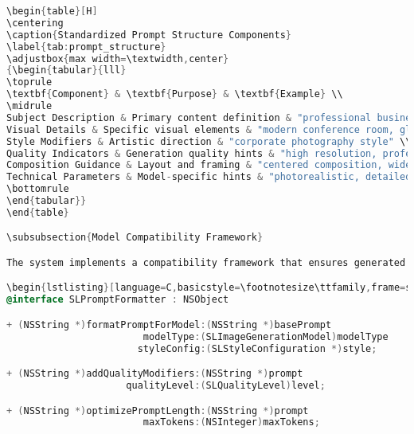 \begin{lstlisting}[language=C,basicstyle=\footnotesize\ttfamily,frame=single,breaklines=true,columns=flexible,caption={Simple Caching Implementation},label={lst:simple_caching}]
\begin{table}[H]
\centering
\caption{Standardized Prompt Structure Components}
\label{tab:prompt_structure}
\adjustbox{max width=\textwidth,center}
{\begin{tabular}{lll}
\toprule
\textbf{Component} & \textbf{Purpose} & \textbf{Example} \\
\midrule
Subject Description & Primary content definition & "professional business meeting" \\
Visual Details & Specific visual elements & "modern conference room, glass table" \\
Style Modifiers & Artistic direction & "corporate photography style" \\
Quality Indicators & Generation quality hints & "high resolution, professional lighting" \\
Composition Guidance & Layout and framing & "centered composition, wide angle" \\
Technical Parameters & Model-specific hints & "photorealistic, detailed textures" \\
\bottomrule
\end{tabular}}
\end{table}

\subsubsection{Model Compatibility Framework}

The system implements a compatibility framework that ensures generated prompts are optimized for different text-to-image generation models while maintaining consistent quality and effectiveness:

\begin{lstlisting}[language=C,basicstyle=\footnotesize\ttfamily,frame=single,breaklines=true,columns=flexible,caption={Prompt Compatibility Implementation},label={lst:prompt_compatibility}]
@interface SLPromptFormatter : NSObject

+ (NSString *)formatPromptForModel:(NSString *)basePrompt 
                        modelType:(SLImageGenerationModel)modelType
                       styleConfig:(SLStyleConfiguration *)style;

+ (NSString *)addQualityModifiers:(NSString *)prompt 
                     qualityLevel:(SLQualityLevel)level;

+ (NSString *)optimizePromptLength:(NSString *)prompt 
                        maxTokens:(NSInteger)maxTokens;


\end{lstlisting}
